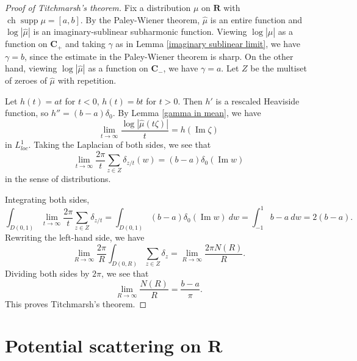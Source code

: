 \documentclass[12pt]{report}
\newcommand{\RR}{\mathbf{R}}
\newcommand{\CC}{\mathbf{C}}
\DeclareMathOperator{\ch}{ch}
\DeclareMathOperator{\supp}{supp}
\renewcommand{\Im}{\operatorname{Im}}
\theoremstyle{definition}
\theoremstyle{remark}
\begin{document}
\begin{proof}[Proof of Titchmarsh's theorem]
Fix a distribution $\mu$ on $\RR$ with $\ch \supp \mu = [a, b]$. By the Paley-Wiener theorem, $\hat \mu$ is an entire function and $\log |\hat \mu|$ is an imaginary-sublinear subharmonic function. Viewing $\log |\hat \mu|$ as a function on $\CC_+$ and taking $\gamma$ as in Lemma \ref{imaginary sublinear limit}, we have $\gamma = b$, since the estimate in the Paley-Wiener theorem is sharp. On the other hand, viewing $\log |\hat \mu|$ as a function on $\CC_-$, we have $\gamma = a$. Let $Z$ be the multiset of zeroes of $\hat \mu$ with repetition.

Let $h(t) = at$ for $t < 0$, $h(t) = bt$ for $t > 0$. Then $h'$ is a rescaled Heaviside function, so $h'' = (b-a)\delta_0$. By Lemma \ref{gamma in mean}, we have
$$\lim_{t \to \infty} \frac{\log |\hat \mu(t\zeta)|}{t} = h(\Im \zeta)$$
in $L^1_{loc}$. Taking the Laplacian of both sides, we see that
$$\lim_{t \to \infty} \frac{2\pi}{t} \sum_{z \in Z} \delta_{z/t}(w) = (b-a)\delta_0(\Im w)$$
in the sense of distributions.

Integrating both sides,
$$\int_{D(0, 1)} \lim_{t \to \infty} \frac{2\pi}{t} \sum_{z \in Z} \delta_{z/t} = \int_{D(0, 1)} (b-a)\delta_0(\Im w) ~dw = \int_{-1}^1 b - a ~dw = 2(b - a).$$
Rewriting the left-hand side, we have
$$\lim_{R \to \infty} \frac{2\pi }{R} \int_{D(0, R)} \sum_{z \in Z} \delta_z = \lim_{R \to \infty} \frac{2\pi N(R)}{R}.$$
Dividing both sides by $2\pi$, we see that
$$\lim_{R \to \infty} \frac{N(R)}{R} = \frac{b - a}{\pi}.$$
This proves Titchmarsh's theorem.
\end{proof}


\chapter{Potential scattering on $\RR$}
\end{document}
